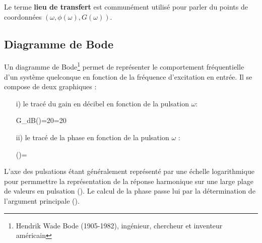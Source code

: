 Le terme \textbf{lieu de transfert} est communément utilisé pour parler du 
points de coordonnées $(\omega, \phi(\omega),G(\omega))$.



\subsection{Diagramme de Bode}
Un diagramme de Bode\footnote{Hendrik Wade Bode (1905-1982), ingénieur, chercheur 
et inventeur américain} permet de représenter le comportement fréquentielle 
d'un système quelconque en fonction de la fréquence d'excitation en entrée.
Il se compose de deux graphiques :
\begin{itemize}
    \item[i)] le tracé du gain en décibel en fonction de la pulsation $\omega$:
        \begin{bequation} 
        G_{dB}(\omega)=20=20 
        \end{bequation}
    \item[ii)] le tracé de la phase en fonction de la pulsation $\omega$ :
        \begin{bequation} 
        \phi(\omega)=
        \end{bequation}
\end{itemize}
L'axe des pulsations étant généralement représenté par une échelle logarithmique 
pour permmettre la représentation de la réponse harmonique sur une large plage de valeurs en pulsation
(). Le calcul de la phase passe lui par la détermination 
de l'argument principale ().

